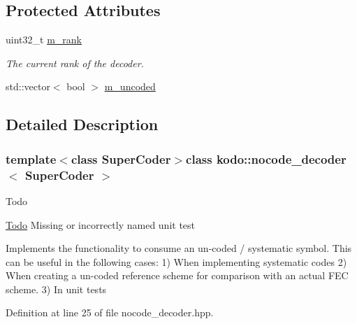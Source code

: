 \subsection*{Protected Attributes}
\begin{DoxyCompactItemize}
\item 
\hypertarget{classkodo_1_1nocode__decoder_ac5bad2c840b37c163c78e17f589b0566}{uint32\-\_\-t \hyperlink{classkodo_1_1nocode__decoder_ac5bad2c840b37c163c78e17f589b0566}{m\-\_\-rank}}\label{classkodo_1_1nocode__decoder_ac5bad2c840b37c163c78e17f589b0566}

\begin{DoxyCompactList}\small\item\em The current rank of the decoder. \end{DoxyCompactList}\item 
std\-::vector$<$ bool $>$ \hyperlink{classkodo_1_1nocode__decoder_a01e62d5c9085d838de1fe22a2fb6de67}{m\-\_\-uncoded}
\end{DoxyCompactItemize}


\subsection{Detailed Description}
\subsubsection*{template$<$class Super\-Coder$>$class kodo\-::nocode\-\_\-decoder$<$ Super\-Coder $>$}

\begin{DoxyRefDesc}{Todo}
\item[\hyperlink{todo__todo000027}{Todo}]Missing or incorrectly named unit test

Implements the functionality to consume an un-\/coded / systematic symbol. This can be useful in the following cases\-: 1) When implementing systematic codes 2) When creating a un-\/coded reference scheme for comparison with an actual F\-E\-C scheme. 3) In unit tests \end{DoxyRefDesc}


Definition at line 25 of file nocode\-\_\-decoder.\-hpp.




